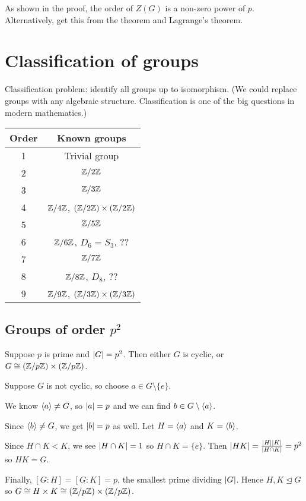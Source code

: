 \documentclass[12pt,letterpaper]{report}
\begin{document}
As shown in the proof, the order of $Z(G)$ is a non-zero power of $p$.
Alternatively, get this from the theorem and Lagrange's theorem.


\section{Classification of groups}

Classification problem: identify all groups up to isomorphism.
(We could replace groups with any algebraic structure.
Classification is one of the big questions in modern mathematics.)

\begin{center}
  \renewcommand{\arraystretch}{1.2}
  \begin{tabular}{c | c}
    Order & Known groups \\
    \hline
    1 & Trivial group \\
    2 & $\mathbb{Z}/{2}\mathbb{Z}$ \\
    3 & $\mathbb{Z}/{3}\mathbb{Z}$ \\
    4 & $\mathbb{Z}/{4}\mathbb{Z}$, $(\mathbb{Z}/{2}\mathbb{Z}) \times (\mathbb{Z}/{2}\mathbb{Z})$ \\
    5 & $\mathbb{Z}/{5}\mathbb{Z}$ \\
    6 & $\mathbb{Z}/{6}\mathbb{Z}$, $D_6 = S_3$, ?? \\
    7 & $\mathbb{Z}/{7}\mathbb{Z}$ \\
    8 & $\mathbb{Z}/{8}\mathbb{Z}$, $D_8$, ?? \\
    9 & $\mathbb{Z}/{9}\mathbb{Z}$, $(\mathbb{Z}/{3}\mathbb{Z}) \times (\mathbb{Z}/{3}\mathbb{Z})$
  \end{tabular}
\end{center}

\pagebreak
\subsection[Groups of order p squared]{Groups of order $p^2$}

\begin{prop}{}{}
  Suppose $p$ is prime and $\lvert G\rvert = p^2$.
  Then either $G$ is cyclic, or $G \cong (\mathbb{Z}/{p}\mathbb{Z}) \times (\mathbb{Z}/{p}\mathbb{Z})$.
\end{prop}

\begin{thmproof}
  Suppose $G$ is not cyclic, so choose $a \in G \setminus \{e\}$.

  We know $\langle a\rangle \neq G$, so $\lvert a\rvert = p$ and we can find $b \in G \setminus \langle a\rangle$.

  Since $\langle b\rangle \neq G$, we get $\lvert b\rvert = p$ as well.
  Let $H = \langle a\rangle$ and $K = \langle b\rangle$.

  Since $H \cap K < K$, we see $\lvert H \cap K\rvert = 1$ so $H \cap K = \{e\}$.
  Then $\lvert HK\rvert = \frac{\lvert H\rvert\lvert K\rvert}{\lvert H \cap K\rvert} = p^2$ so $HK = G$.

  Finally, $[G : H] = [G : K] = p$, the smallest prime dividing $\lvert G\rvert$.
  Hence $H, K \trianglelefteq G$ so $G \cong H \times K \cong (\mathbb{Z}/{p}\mathbb{Z}) \times (\mathbb{Z}/{p}\mathbb{Z})$.
\end{thmproof}
\end{document}
